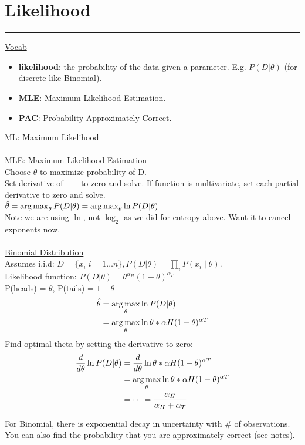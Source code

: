 \section{Likelihood}
\smallskip \hrule height 2pt \smallskip

\underline{Vocab}
\begin{itemize}
	\item\textbf{likelihood}: the probability of the data given a parameter.  E.g. $P(D | \theta)$ (for discrete like Binomial).  
	\item \textbf{MLE}: Maximum Likelihood Estimation. 
	\item \textbf{PAC}: Probability Approximately Correct. 
\end{itemize}

\underline{ML}: Maximum Likelihood \hfill \\
 \hfill \\
 
\underline{MLE}: Maximum Likelihood Estimation \hfill \\
Choose $\theta$ to maximize probability of D. \hfill \\
Set derivative of \_\_ to zero and solve.  If function is multivariate, set each partial derivative to zero and solve. \hfill \\
$\hat{\theta} = \operatorname*{arg\,max}_\theta P(D | \theta) = \operatorname*{arg\,max}_\theta \ln P(D | \theta) $ \hfill \\
Note we are using $\ln$, not $\log_2$ as we did for entropy above.  Want it to cancel exponents now. 
 \hfill \\
 
\hfill \\
\underline{Binomial Distribution} \hfill \\
Assumes i.i.d: $D=\{x_i | i=1 \dots n\}, P(D | \theta) = \prod_i P(x_i \mid \theta)$. \hfill \\
Likelihood function: $P(D | \theta) = \theta^{\alpha_H} (1-\theta)^{\alpha_T}$  \hfill \\
P(heads) = $\theta$, P(tails) = $1 - \theta$ \hfill \\
\begin{align*} 
	\hat{\theta} &= \operatorname*{arg\,max}_\theta \ln P(D| \theta) \\
	 	 &= \operatorname*{arg\,max}_\theta \ln \theta*{\alpha H}(1-\theta)^{\alpha T}
\end{align*}
Find optimal theta by setting the derivative to zero: 
\begin{align*} 
	\frac{d}{d\theta} \ln P(D| \theta) &= \frac{d}{d\theta}  \ln \theta*{\alpha H}(1-\theta)^{\alpha T} \\
	 	 &= \operatorname*{arg\,max}_\theta \ln \theta*{\alpha H}(1-\theta)^{\alpha T} \\
		 & = \dots = \frac{\alpha_H}{\alpha_H  + \alpha_T}
\end{align*}

For Binomial, there is exponential decay in uncertainty with \# of observations.  %
You can also find the probability that you are approximately correct (see \href{http://courses.cs.washington.edu/courses/cse446/16wi/Slides/3_PointEstimation.pdf}{notes}). 

